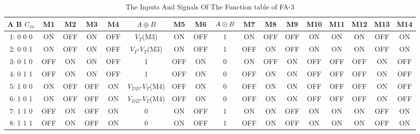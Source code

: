 \documentclass[conference]{IEEEtran}
\begin{document}
\begin{table}[!ht]
	\renewcommand{\arraystretch}{1.3}
	\caption{The Inputs And Signals Of The Function table of FA-3}
	\centering
	\begin{tabular}{ c *{16}{c}}
		\hline
		A B \(C_{in}\) & M1  & M2  & M3  & M4  & \(A \oplus B\)         & M5  & M6  & \(A \varodot B\) & M7  & M8  & M9  & M10 & M11 & M12 & M13 & M14 \\
		\hline
		1: 0 0 0       & ON  & OFF & ON  & OFF & \(V_{T}\)(M3)          & ON  & OFF & 1                & ON  & OFF & OFF & ON  & ON  & ON  & OFF & ON  \\
		2: 0 0 1       & ON  & OFF & ON  & OFF & \(V_{T}\)-\(V_T\)(M3)  & ON  & OFF & 1                & OFF & ON  & OFF & ON  & ON  & ON  & OFF & ON  \\
		3: 0 1 0       & OFF & ON  & ON  & OFF & 1                      & OFF & ON  & 0                & ON  & OFF & ON  & OFF & OFF & OFF & ON  & OFF \\
		4: 0 1 1       & OFF & ON  & ON  & OFF & 1                      & OFF & ON  & 0                & OFF & ON  & ON  & OFF & OFF & OFF & ON  & OFF \\
		5: 1 0 0       & ON  & OFF & OFF & ON  & \(V_{DD}\)-\(V_T\)(M4) & OFF & ON  & 0                & OFF & ON  & ON  & OFF & OFF & OFF & ON  & OFF \\
		6: 1 0 1       & ON  & OFF & OFF & ON  & \(V_{DD}\)-\(V_T\)(M4) & OFF & ON  & 0                & OFF & ON  & ON  & OFF & OFF & OFF & ON  & OFF \\
		7: 1 1 0       & OFF & ON  & OFF & ON  & 0                      & ON  & OFF & 1                & ON  & ON  & OFF & ON  & ON  & ON  & OFF & ON  \\
		8: 1 1 1       & OFF & ON  & OFF & ON  & 0                      & ON  & OFF & 1                & OFF & ON  & OFF & ON  & ON  & ON  & OFF & ON  \\
		\hline
	\end{tabular}
	\label{tb:fa3-func-pattern-in}
\end{table}
\end{document}
